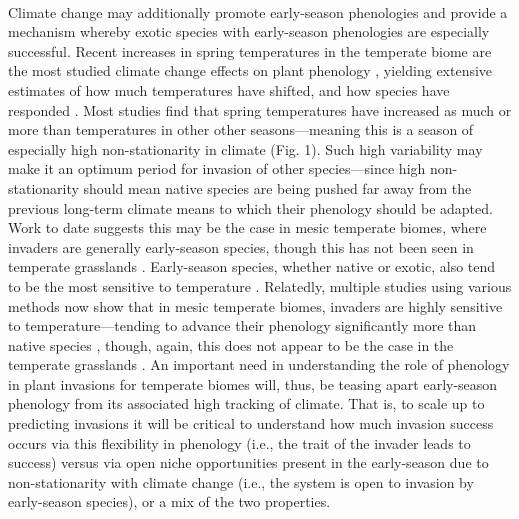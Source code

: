 \documentclass[11pt,a4paper,oneside]{article}
\begin{document}
\\
Climate change may additionally promote early-season phenologies and provide a mechanism whereby exotic species with early-season phenologies are especially successful. Recent increases in spring temperatures in the temperate biome \citep[at least partially associated with increased in greenhouse gases, see][]{Trenberth:2007hk} are the most studied climate change effects on plant phenology \citep{Pau:2011wd}, yielding extensive estimates of how much temperatures have shifted, and how species have responded \citep{Parmesan:2003dm,Root:2003kl,Menzel:2006sq}. Most studies find that spring temperatures have increased as much or more than temperatures in other other seasons---meaning this is a season of especially high non-stationarity in climate (Fig. 1). Such high variability may make it an optimum period for invasion of other species---since high non-stationarity should mean native species are being pushed far away from the previous long-term climate means to which their phenology should be adapted. Work to date suggests this may be the case in mesic temperate biomes, where invaders are generally early-season species, though this has not been seen in temperate grasslands \citep{wolkovichAmBot2013}. Early-season species, whether native or exotic, also tend to be the most sensitive to temperature \citep{Cook:2012,Wolkovich:2012n}. Relatedly, multiple studies using various methods now show that in mesic temperate biomes, invaders are highly sensitive to temperature---tending to advance their phenology significantly more than native species \citep{Willis:2010al,wolkovichAmBot2013}, though, again, this does not appear to be the case in the temperate grasslands \citep{wolkovichAmBot2013}. An important need in understanding the role of phenology in plant invasions for temperate biomes will, thus, be teasing apart early-season phenology from its associated high tracking of climate. That is, to scale up to predicting invasions it will be critical to understand how much invasion success occurs via this flexibility in phenology (i.e., the trait of the invader leads to success) versus via open niche opportunities present in the early-season due to non-stationarity with climate change (i.e., the system is open to invasion by early-season species), or a mix of the two properties.\\
\\
\end{document}
